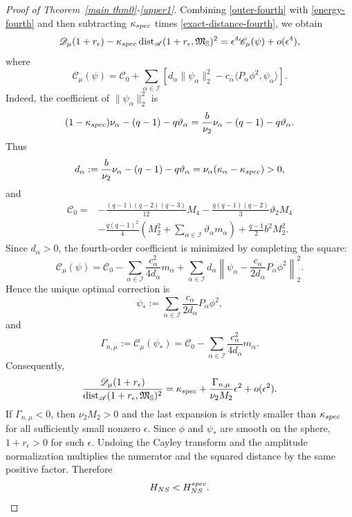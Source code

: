 \documentclass[10pt,a4paper]{amsart}
\begin{document}
\begin{proof}[Proof of Theorem~\ref{main thm0}-\eqref{upper1}]
Combining \eqref{outer-fourth} with \eqref{energy-fourth} and then subtracting $\kappa_{\rm spec}$ times \eqref{exact-distance-fourth}, we obtain
\begin{equation*}
 \mathscr D_\mu(1+r_\epsilon)-\kappa_{\rm spec}\operatorname{dist}_{\mathscr A}(1+r_\epsilon,\mathfrak M_{\mathbb S})^2
 =\epsilon^4\mathscr C_\mu(\psi)+o(\epsilon^4),
\end{equation*}
where
\begin{equation*}
 \mathscr C_\mu(\psi)=\mathscr C_0+
 \sum_{\alpha\in\mathcal I}\left[d_\alpha\|\psi_\alpha\|_2^2-c_\alpha\langle P_\alpha\phi^2,\psi_\alpha\rangle\right].
\end{equation*}
Indeed, the coefficient of $\|\psi_\alpha\|_2^2$ is
\[
(1-\kappa_{\rm spec})\nu_\alpha-(q-1)-q\vartheta_\alpha
=\frac b{\nu_2}\nu_\alpha-(q-1)-q\vartheta_\alpha.
\]
Thus
\begin{equation}\label{dc-def}
 d_\alpha:=\frac b{\nu_2}\nu_\alpha-(q-1)-q\vartheta_\alpha
 =\nu_\alpha(\kappa_\alpha-\kappa_{\rm spec})>0,
\end{equation}
\endgroup
and
\begin{align}\label{C0-def}
 \mathscr C_0={}&-\frac{(q-1)(q-2)(q-3)}{12}M_4
 -\frac{q(q-1)(q-2)}3\vartheta_2M_4\nonumber\\
 &-\frac{q(q-1)^2}{4}\left(M_2^2+\sum_{\alpha\in\mathcal I}\vartheta_\alpha m_\alpha\right)
 +\frac{q-1}{2}b^2M_2^2.
\end{align}
\begingroup
Since $d_\alpha>0$, the fourth-order coefficient is minimized by completing the square:
\[
\mathscr C_\mu(\psi)
=\mathscr C_0-\sum_{\alpha\in\mathcal I}\frac{c_\alpha^2}{4d_\alpha}m_\alpha
+\sum_{\alpha\in\mathcal I}d_\alpha
\left\|\psi_\alpha-\frac{c_\alpha}{2d_\alpha}P_\alpha\phi^2\right\|_2^2.
\]
Hence the unique optimal correction is
\[
 \psi_*:=\sum_{\alpha\in\mathcal I}\frac{c_\alpha}{2d_\alpha}P_\alpha\phi^2,
\]
and
\begin{equation}\label{Gamma-def}
 \Gamma_{n,\mu}:=\mathscr C_\mu(\psi_*)
 =\mathscr C_0-\sum_{\alpha\in\mathcal I}\frac{c_\alpha^2}{4d_\alpha}m_\alpha.
\end{equation}
\endgroup
Consequently,
\begin{equation*}
 \frac{\mathscr D_\mu(1+r_\epsilon)}{\operatorname{dist}_{\mathscr A}(1+r_\epsilon,\mathfrak M_{\mathbb S})^2}
 =\kappa_{\rm spec}+\frac{\Gamma_{n,\mu}}{\nu_2M_2}\epsilon^2+o(\epsilon^2).
\end{equation*}
If $\Gamma_{n,\mu}<0$, then $\nu_2M_2>0$ and the last expansion is strictly smaller than $\kappa_{\rm spec}$ for all sufficiently small nonzero $\epsilon$. Since $\phi$ and $\psi_*$ are smooth on the sphere, $1+r_\epsilon>0$ for such $\epsilon$. Undoing the Cayley transform and the amplitude normalization multiplies the numerator and the squared distance by the same positive factor. Therefore
\[
H_{NS}<H_{NS}^{\rm spec}.
\]

\end{proof}
\end{document}

